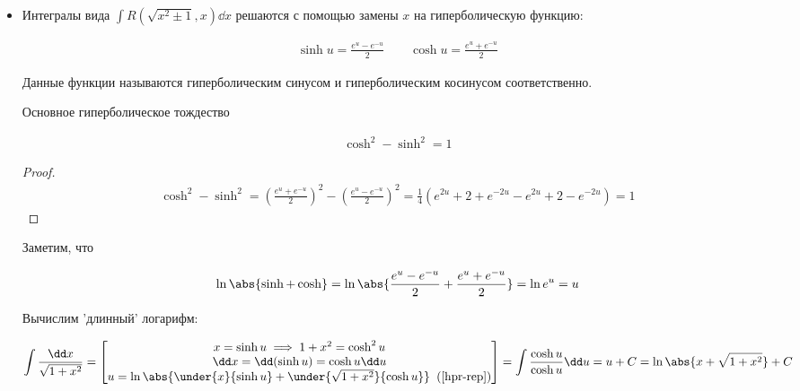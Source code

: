 
\begin{itemize}
\item Интегралы вида \(\int R(\sqrt{x^2 \pm 1}, x) \dd x\) решаются с помощью
замены \(x\) на гиперболическую функцию:

\begin{align*}
  \sinh u = \frac{e^u - e^{-u}}{2} \qquad
  \cosh u = \frac{e^u + e^{-u}}{2}
\end{align*}
\begin{remark}
  Данные функции называются гиперболическим синусом и гиперболическим косинусом
  соответственно.
\end{remark}

\begin{lemma}
  Основное гиперболическое тождество

  \begin{align*}
    \cosh^2 - \sinh^2 = 1
  \end{align*}
\end{lemma}
\begin{proof}
  \begin{align*}
    \cosh^2 - \sinh^2 =
    \left(\frac{e^{u} + e^{-u}}{2}\right)^2
      - \left(\frac{e^{u} - e^{-u}}{2}\right)^2 =
    \frac{1}{4} \left(e^{2u} + 2 + e^{-2u} - e^{2u} + 2 - e^{-2u} \right) = 1
  \end{align*}
\end{proof}

\begin{remark}\label{hpr-rep}
  Заметим, что

  \begin{align*}
    \ln \abs{\sinh + \cosh}
    = \ln \abs{\frac{e^u - e^{-u}}{2} + \frac{e^u + e^{-u}}{2}}
    = \ln e^{u}
    = u
  \end{align*}
\end{remark}

\begin{example}
  Вычислим 'длинный' логарифм:

  \begin{align*}
    \int \frac{\dd x}{\sqrt{1 + x^2}} = 
    \begin{bmatrix}
      x = \sinh u \implies 1 + x^2 = \cosh^2 u \\
      \dd x = \dd (\sinh u) = \cosh u \dd u \\
      u = \ln \abs{
        \under{x}{\sinh u} + \under{\sqrt{1 + x^2}}{\cosh u}
      } \;\; (\ref{hpr-rep})
    \end{bmatrix} =
    \int \frac{\cosh u}{\cosh u} \dd u =
    u + C =
    \ln \abs{x + \sqrt{1 + x^2}} + C
  \end{align*}
\end{example}


\end{itemize}
